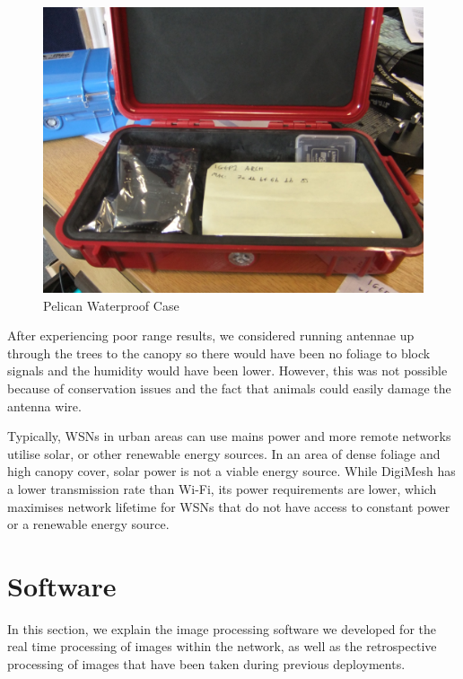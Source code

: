 			\begin{figure}[H]
			\centering
			\includegraphics[width=\textwidth]{Chap3/figures/pelican}
			\caption{Pelican Waterproof Case}
			\label{fig:tech:pelican}
			\end{figure}

	After experiencing poor range results, we considered running antennae up through the trees to the canopy so there would have been no foliage to block signals and the humidity would have been lower. However, this was not possible because of conservation issues and the fact that animals could easily damage the antenna wire.

	Typically, WSNs in urban areas can use mains power and more remote networks utilise solar, or other renewable energy sources. In an area of dense foliage and high canopy cover, solar power is not a viable energy source. While DigiMesh has a lower transmission rate than Wi-Fi, its power requirements are lower, which maximises network lifetime for WSNs that do not have access to constant power or a renewable energy source.

\section{Software}\label{tech:sw}
	In this section, we explain the image processing software we developed for the real time processing of images within the network, as well as the retrospective processing of images that have been taken during previous deployments.


